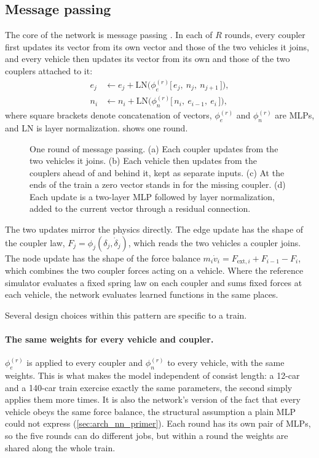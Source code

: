\subsection{Message passing}

The core of the network is message passing \cite{battaglia2016interaction,gilmer2017mpnn}. In each of $R$ rounds, every coupler first updates its vector from its own vector and those of the two vehicles it joins, and every vehicle then updates its vector from its own and those of the two couplers attached to it:
\begin{align}
    e_j &\leftarrow e_j + \mathrm{LN}\bigl(\phi_e^{(r)}\bigl[\,e_j,\ n_j,\ n_{j+1}\,\bigr]\bigr), \label{eq:arch_edge_update} \\
    n_i &\leftarrow n_i + \mathrm{LN}\bigl(\phi_n^{(r)}\bigl[\,n_i,\ e_{i-1},\ e_i\,\bigr]\bigr), \label{eq:arch_node_update}
\end{align}
where square brackets denote concatenation of vectors, $\phi_e^{(r)}$ and $\phi_n^{(r)}$ are MLPs, and LN is layer normalization.  shows one round.

\begin{figure}[htbp]
    \centering
    \resizebox{\textwidth}{!}{}
    \caption{One round of message passing. (a) Each coupler updates from the two vehicles it joins. (b) Each vehicle then updates from the couplers ahead of and behind it, kept as separate inputs. (c) At the ends of the train a zero vector stands in for the missing coupler. (d) Each update is a two-layer MLP followed by layer normalization, added to the current vector through a residual connection.}
    \label{fig:arch_message_passing}
\end{figure}

The two updates mirror the physics directly. The edge update has the shape of the coupler law, $F_j = \phi_j(\delta_j, \dot\delta_j)$, which reads the two vehicles a coupler joins. The node update has the shape of the force balance $m_i\dot v_i = F_{\mathrm{ext},i} + F_{i-1} - F_i$, which combines the two coupler forces acting on a vehicle. Where the reference simulator evaluates a fixed spring law on each coupler and sums fixed forces at each vehicle, the network evaluates learned functions in the same places.

Several design choices within this pattern are specific to a train.

\paragraph{The same weights for every vehicle and coupler.} $\phi_e^{(r)}$ is applied to every coupler and $\phi_n^{(r)}$ to every vehicle, with the same weights. This is what makes the model independent of consist length: a 12-car and a 140-car train exercise exactly the same parameters, the second simply applies them more times. It is also the network's version of the fact that every vehicle obeys the same force balance, the structural assumption a plain MLP could not express (\cref{sec:arch_nn_primer}). Each round has its own pair of MLPs, so the five rounds can do different jobs, but within a round the weights are shared along the whole train.

